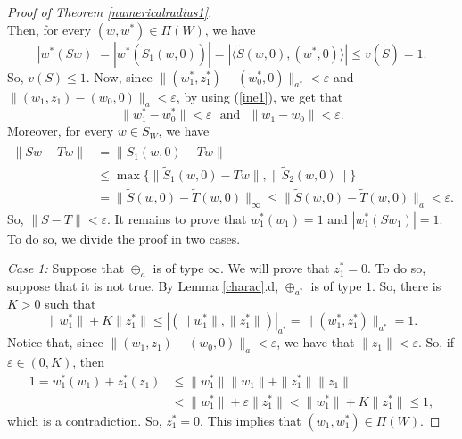 \documentclass[10pt,a4paper]{amsart}
\theoremstyle{plain}
\theoremstyle{definition}
\newcommand{\eps}{\varepsilon}
\renewcommand{\leq}{\leqslant}
\begin{document}
\begin{proof}[Proof of Theorem \ref{numericalradius1}]
\begin{equation*}
\end{equation*}
Then, for every $(w, w^*) \in \Pi(W)$, we have
\begin{equation} \label{eq1}
|w^*(Sw)| = |w^*(\widetilde{S}_1(w, 0))| = | \langle \widetilde{S}(w, 0), (w^*, 0) \rangle| \leq v(\widetilde{S}) = 1.
\end{equation}
So, $v(S) \leq 1$. Now, since $\|(w_1^*, z_1^*) - (w_0^*, 0)\|_{a^*} < \eps$ and $\|(w_1, z_1) - (w_0, 0)\|_a < \eps$, by using (\ref{ine1}), we get that
\begin{equation*}
\|w_1^* - w_0^*\| < \eps \ \ \ \mbox{and} \ \ \ \|w_1 - w_0\| < \eps.	
\end{equation*}
Moreover, for every $w \in S_W$, we have
\begin{align*}
\|Sw - Tw\| &= \|\widetilde{S}_1(w, 0) - Tw\| \\
&\leq \max \{ \|\widetilde{S}_1(w, 0) - Tw\|, \|\widetilde{S}_2(w, 0)\| \} \\
&= \|\widetilde{S}(w, 0) - \widetilde{T}(w, 0)\|_{\infty}
\leq \|\widetilde{S}(w, 0) - \widetilde{T}(w, 0)\|_a < \eps.
\end{align*}
So, $\|S - T\| < \eps$. It remains to prove that $w_1^*(w_1) = 1$ and $|w_1^*(Sw_1)| = 1$. To do so, we divide the proof in two cases.

\noindent
{\it Case 1:} Suppose that $\oplus_a$ is of type $\infty$. We will prove that $z_1^* = 0$. To do so, suppose that it is not true. By Lemma \ref{charac}.d, $\oplus_{a^*}$ is of type $1$. So, there is $K > 0$ such that
\begin{equation*}
\|w_1^*\| + K \|z_1^*\| \leq |(\|w_1^*\|, \|z_1^*\|)|_{a^*} = \|(w_1^*, z_1^*)\|_{a^*} = 1.
\end{equation*}
Notice that, since $\|(w_1, z_1) - (w_0, 0)\|_a < \eps$, we have that $\|z_1\| < \eps$. So, if $\eps \in (0, K)$, then
\begin{align*}
1 = w_1^*(w_1) + z_1^*(z_1) &\leq \|w_1^*\|\|w_1\| + \|z_1^*\|\|z_1\| \\
&< \|w_1^*\| + \eps \|z_1^*\| < \|w_1^*\| + K \|z_1^*\| \leq 1,
\end{align*}
which is a contradiction. So, $z_1^* = 0$. This implies that $(w_1, w_1^*) \in \Pi(W)$.



\end{proof}
\end{document}
